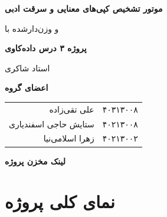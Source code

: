 \documentclass[11pt,a4paper]{article}
\begin{document}
	\begin{titlepage}
		\centering
		
		\vspace*{2cm}
		
		{\Huge\bfseries موتور تشخیص کپی‌های معنایی و سرقت ادبی \par}
		
		\vspace{0.8cm}
		
		{\Large {} و  وزن‌دارشده با  \par}
		
		\vspace{2cm}
		
		{\Large\bfseries پروژه ۳ درس داده‌کاوی \par}
		
		\vspace{0.6cm}
		
		{\large استاد شاکری \par}
		
		\vspace{1.8cm}
		
		{\Large\bfseries اعضای گروه \par}
		
		\vspace{0.8cm}
		
		\begin{tabular}{rl}
			علی تقی‌زاده & ۴۰۳۱۳۰۰۸ \\
			ستایش حاجی اسفندیاری & ۴۰۲۱۳۰۰۸ \\
			زهرا اسلامی‌نیا & ۴۰۲۱۳۰۰۲ \\
		\end{tabular}
		
		\vfill
		


{\large\bfseries لینک مخزن پروژه \par}
\vspace{0.3cm}

{\large
	\href{https://github.com/alitkbbl/Semantic-Plagiarism-Engine}
	{}
	\par}

\vspace{1cm}
		
	\end{titlepage}
	
	\tableofcontents
	\newpage

	\section{نمای کلی پروژه}
	
\end{document}
